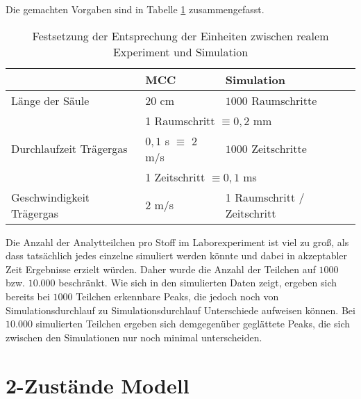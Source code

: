 Die gemachten Vorgaben sind in Tabelle \ref{einheiten} zusammengefasst.

\begin{table}[H]
\centering
\caption[Entsprechung der Einheiten]{Festsetzung der Entsprechung der Einheiten zwischen realem Experiment und Simulation}
\label{einheiten}
\begin{tabular}{|l||l|l|}
\hline
			  & MCC                 			& Simulation              \\ \hline \hline
Länge der Säule           & $20$ cm               		& $1000$ Raumschritte       \\ \hline
			  & \multicolumn{2}{l|}{1 Raumschritt $\equiv 0,2$ mm} \\ \hline
Durchlaufzeit Trägergas   & $0,1$ s $\equiv$ $2$ m/s       	& $1000$ Zeitschritte       \\ \hline
			  & \multicolumn{2}{l|}{1 Zeitschritt $\equiv 0,1$ ms} \\ \hline
Geschwindigkeit Trägergas & $2$ m/s 				& 1 Raumschritt / Zeitschritt \\ \hline
\end{tabular}
\end{table}

Die Anzahl der Analytteilchen pro Stoff im Laborexperiment ist viel zu groß, als dass tatsächlich jedes einzelne simuliert werden könnte und dabei in akzeptabler Zeit Ergebnisse erzielt würden. Daher wurde die Anzahl der Teilchen auf $1000$ bzw. $10.000$ beschränkt. Wie sich in den simulierten Daten zeigt, ergeben sich bereits bei $1000$ Teilchen erkennbare Peaks, die jedoch noch von Simulationsdurchlauf zu Simulationsdurchlauf Unterschiede aufweisen können. Bei $10.000$ simulierten Teilchen ergeben sich demgegenüber geglättete Peaks, die sich zwischen den Simulationen nur noch minimal unterscheiden.


\section{2-Zustände Modell}
\label{chapter:mod:2p}

